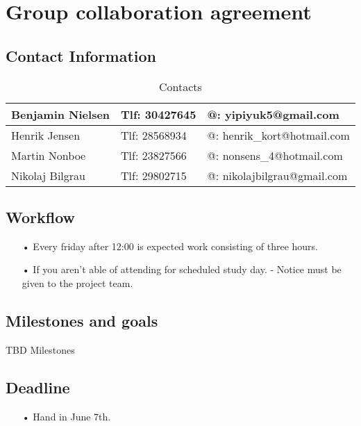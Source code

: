 \section{Group collaboration agreement}
\subsection{Contact Information}
\begin{table}[h!]
\centering
\caption{Contacts}
\label{Contact info}
\begin{tabular}{|l|l|l|}
\hline
Benjamin Nielsen & Tlf: 30427645 & @: yipiyuk5@gmail.com       \\ \hline
Henrik Jensen    & Tlf: 28568934 & @: henrik\_kort@hotmail.com \\ \hline
Martin Nonboe    & Tlf: 23827566 & @: nonsens\_4@hotmail.com   \\ \hline
Nikolaj Bilgrau  & Tlf: 29802715 & @: nikolajbilgrau@gmail.com \\ \hline
\end{tabular}
\end{table}

\subsection{Workflow}
\begin{enumerate}
	\item[•]Every friday after 12:00 is expected work consisting of three hours.   
	\item[•]If you aren’t able of attending for scheduled study day. - Notice must be given to the project team. 
\end{enumerate}

\subsection{Milestones and goals}
TBD Milestones

\subsection{Deadline}
\begin{enumerate}
	\item[•]Hand in June 7th.
\end{enumerate}
